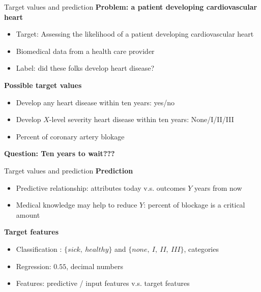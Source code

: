 \documentclass{beamer}
\begin{document}
\begin{frame}{Target values and prediction}
\textbf{Problem: a patient developing cardiovascular heart}
\begin{itemize}
\item Target: Assessing the likelihood of a patient developing cardiovascular heart
\item Biomedical data from a health care provider
\item Label: did these folks develop heart disease?
\end{itemize}
\vspace{6pt}
\textbf{Possible target values}
\begin{itemize}
\item Develop any heart disease within ten years: yes/no
\item Develop $X$-level severity heart disease within ten years: None/I/II/III
\item Percent of coronary artery blokage
\end{itemize}
\vspace{6pt}
\textbf{Question: Ten years to wait???}
\end{frame}

\begin{frame}{Target values and prediction}
\textbf{Prediction}
\begin{itemize}
\item Predictive relationship: attributes today v.s. outcomes $Y$ years from now
\item Medical knowledge may help to reduce $Y$: percent of blockage is a critical amount
\end{itemize}
\vspace{6pt}
\textbf{Target features}
\begin{itemize}
\item Classification : $\{sick,\ healthy\}$ and $\{none,\ I,\ II, \ III\}$, categories
\item Regression: $0.55$, decimal numbers
\item Features: predictive / input features v.s. target features 
\end{itemize}
\end{frame}
\end{document}
